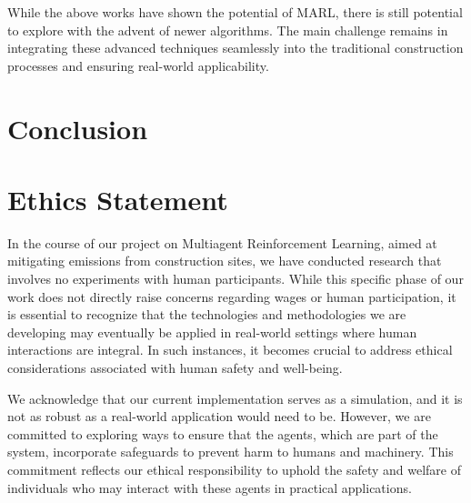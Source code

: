 \documentclass[conference]{IEEEtran}
\begin{document}
	While the above works have shown the potential of MARL, there is still potential to explore with the advent of newer algorithms. The main challenge remains in integrating these advanced techniques seamlessly into the traditional construction processes and ensuring real-world applicability.

	\noindent


	\section{Conclusion}




	\newpage
	
	


\newpage

\appendices 
\section{Ethics Statement}
In the course of our project on Multiagent Reinforcement Learning, aimed at mitigating \coo emissions
from construction sites, we have conducted research that involves no experiments with human participants.
While this specific phase of our work does not directly raise concerns regarding wages or human
participation, it is essential to recognize that the technologies and methodologies we are developing
may eventually be applied in real-world settings where human interactions are integral. In such instances,
it becomes crucial to address ethical considerations associated with human safety and well-being.

We acknowledge that our current implementation serves as a simulation, and it is not as robust as a
real-world application would need to be. However, we are committed to exploring ways to ensure that the
agents, which are part of the system, incorporate safeguards to prevent harm to humans and machinery.
This commitment reflects our ethical responsibility to uphold the safety and welfare of individuals who
may interact with these agents in practical applications.
\end{document}
